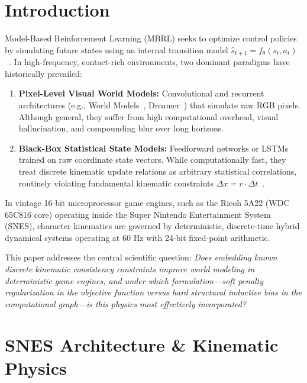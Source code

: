 \documentclass[10pt,twocolumn,letterpaper]{article}
\begin{document}
\section{Introduction}
Model-Based Reinforcement Learning (MBRL) seeks to optimize control policies by simulating future states using an internal transition model $\hat{s}_{t+1} = f_\theta(s_t, a_t)$~\cite{sutton1990integrated, janner2019trust}. In high-frequency, contact-rich environments, two dominant paradigms have historically prevailed:
\begin{enumerate}
    \item \textbf{Pixel-Level Visual World Models:} Convolutional and recurrent architectures (e.g., World Models~\cite{ha2018world}, Dreamer~\cite{hafner2020mastering}) that simulate raw RGB pixels. Although general, they suffer from high computational overhead, visual hallucination, and compounding blur over long horizons.
    \item \textbf{Black-Box Statistical State Models:} Feedforward networks or LSTMs trained on raw coordinate state vectors. While computationally fast, they treat discrete kinematic update relations as arbitrary statistical correlations, routinely violating fundamental kinematic constraints $\Delta x = v \cdot \Delta t$~\cite{raissi2019physics}.
\end{enumerate}

In vintage 16-bit microprocessor game engines, such as the Ricoh 5A22 (WDC 65C816 core) operating inside the Super Nintendo Entertainment System (SNES), character kinematics are governed by deterministic, discrete-time hybrid dynamical systems operating at 60 Hz with 24-bit fixed-point arithmetic.

This paper addresses the central scientific question: \textit{Does embedding known discrete kinematic consistency constraints improve world modeling in deterministic game engines, and under which formulation---soft penalty regularization in the objective function versus hard structural inductive bias in the computational graph---is this physics most effectively incorporated?}

\section{SNES Architecture \& Kinematic Physics}
\end{document}
